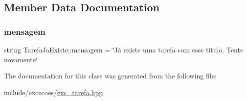 \subsection{Member Data Documentation}
\mbox{\label{classTarefaJaExiste_a29db5b452baf0e27ee2fa9f14c683ed0}} 
\subsubsection{\texorpdfstring{mensagem}{mensagem}}
{\footnotesize\ttfamily string Tarefa\+Ja\+Existe\+::mensagem = \char`\"{}Já existe uma tarefa com esse título. Tente novamente\char`\"{}\hspace{0.3cm}{\ttfamily [private]}}



The documentation for this class was generated from the following file\+:\begin{DoxyCompactItemize}
\item 
include/excecoes/\hyperlink{exc__tarefa_8hpp}{exc\+\_\+tarefa.\+hpp}\end{DoxyCompactItemize}
